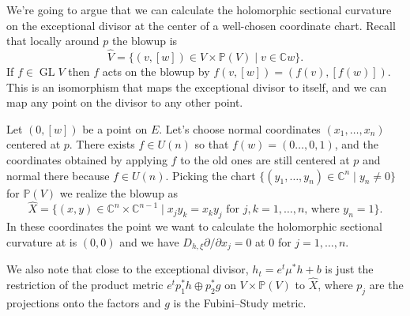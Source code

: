 \documentclass[10pt,a4paper]{amsart}
\newcommand{\kk}[1]{\mathbb{#1}}
\DeclareMathOperator{\GL}{GL}
\def\hsc{holomorphic sectional curvature}
\def\bl#1{\widehat{#1}}
\begin{document}
We're going to argue that we can calculate the \hsc{} on the exceptional divisor
at the center of a well-chosen coordinate chart.
Recall that locally around $p$ the blowup is
$$
\bl V
= \{ (v,[w]) \in V \times \kk P(V) \mid v \in \kk C w \}.
$$
If $f \in \GL V$ then $f$ acts on the blowup by $f(v, [w]) = (f(v), [f(w)])$.
This is an isomorphism that maps the exceptional divisor to itself, and we can
map any point on the divisor to any other point.

Let $(0, [w])$ be a point on $E$.
Let's choose normal coordinates $(x_1,\ldots,x_n)$ centered at $p$.
There exists $f \in U(n)$ so that $f(w) = (0 \ldots, 0, 1)$, and the
coordinates obtained by applying $f$ to the old ones are still centered at $p$
and normal there because $f \in U(n)$.
Picking the chart $\{(y_1, \ldots, y_n) \in \kk C^n \mid y_n \not= 0 \}$ for
$\kk P(V)$
we realize the blowup as
$$
\bl X
= \{ (x,y) \in \kk C^n \times \kk C^{n-1}
\mid x_j y_k = x_k y_j \text{ for $j,k = 1,\ldots,n$, where $y_n = 1$}  \}.
$$
In these coordinates the point we want to calculate the \hsc{} at is $(0,0)$
and we have $D_{h,\xi} \partial / \partial x_j = 0$ at $0$ for $j = 1, \ldots, n$.

We also note that close to the exceptional divisor, $h_t = e^t \mu^* h + b$ is
just the restriction of the product metric $e^t p_1^* h \oplus p_2^* g$ on
$V \times \kk P(V)$ to $\bl X$, where $p_j$ are the projections onto the
factors and $g$ is the Fubini--Study metric.
\end{document}
